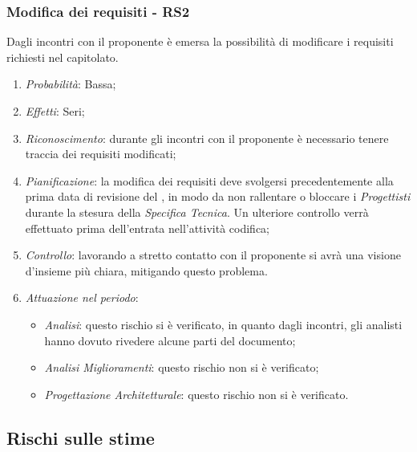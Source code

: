 \subsubsection{Modifica dei requisiti - RS2}
Dagli incontri con il proponente \`e emersa la possibilit\`a di modificare i requisiti richiesti nel capitolato.
\begin{enumerate}
\item \textit{Probabilit\`a}: Bassa;
\item \textit{Effetti}: Seri;
\item \textit{Riconoscimento}: durante gli incontri con il proponente è necessario tenere traccia dei requisiti modificati;
\item \textit{Pianificazione}: la modifica dei requisiti deve svolgersi precedentemente alla prima data di revisione del , in modo da non rallentare o bloccare i \textit{Progettisti} durante la stesura della \textit{Specifica Tecnica}. Un ulteriore controllo verr\`a effettuato prima dell'entrata nell'attivit\`a codifica;
\item \textit{Controllo}: lavorando a stretto contatto con il proponente si avr\`a una visione d'insieme pi\`u chiara, mitigando questo problema.
\item \textit{Attuazione nel periodo}: 
	\begin{itemize}
	\item \textit{Analisi}: questo rischio si è verificato, in quanto dagli incontri, gli analisti hanno dovuto rivedere alcune parti del documento;
	\item \textit{Analisi Miglioramenti}: questo rischio non si è verificato;
	\item \textit{Progettazione Architetturale}: questo rischio non si è verificato.
	\end{itemize}
\end{enumerate}

\subsection{Rischi sulle stime}
